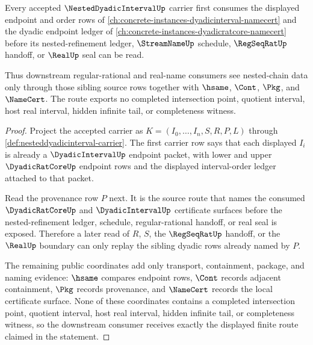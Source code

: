 \begin{theorem}
\label{thm:nesteddyadicinterval-dyadicinterval-source-route}
Every accepted $\NestedDyadicIntervalUp$ carrier first consumes the displayed endpoint and order rows of \autoref{ch:concrete-instances-dyadicinterval-namecert} and the dyadic endpoint ledger of \autoref{ch:concrete-instances-dyadicratcore-namecert} before its nested-refinement ledger, $\StreamNameUp$ schedule, $\RegSeqRatUp$ handoff, or $\RealUp$ seal can be read.

Thus downstream regular-rational and real-name consumers see nested-chain data only through those sibling source rows together with $\hsame$, $\Cont$, $\Pkg$, and $\NameCert$. The route exports no completed intersection point, quotient interval, host real interval, hidden infinite tail, or completeness witness.
\end{theorem}
\begin{proof}
Project the accepted carrier as $K=(I_0,\ldots,I_n,S,R,P,L)$ through \autoref{def:nesteddyadicinterval-carrier}. The first carrier row says that each displayed $I_i$ is already a $\DyadicIntervalUp$ endpoint packet, with lower and upper $\DyadicRatCoreUp$ endpoint rows and the displayed interval-order ledger attached to that packet.

Read the provenance row $P$ next. It is the source route that names the consumed $\DyadicRatCoreUp$ and $\DyadicIntervalUp$ certificate surfaces before the nested-refinement ledger, schedule, regular-rational handoff, or real seal is exposed. Therefore a later read of $R$, $S$, the $\RegSeqRatUp$ handoff, or the $\RealUp$ boundary can only replay the sibling dyadic rows already named by $P$.

The remaining public coordinates add only transport, containment, package, and naming evidence: $\hsame$ compares endpoint rows, $\Cont$ records adjacent containment, $\Pkg$ records provenance, and $\NameCert$ records the local certificate surface. None of these coordinates contains a completed intersection point, quotient interval, host real interval, hidden infinite tail, or completeness witness, so the downstream consumer receives exactly the displayed finite route claimed in the statement.
\end{proof}

